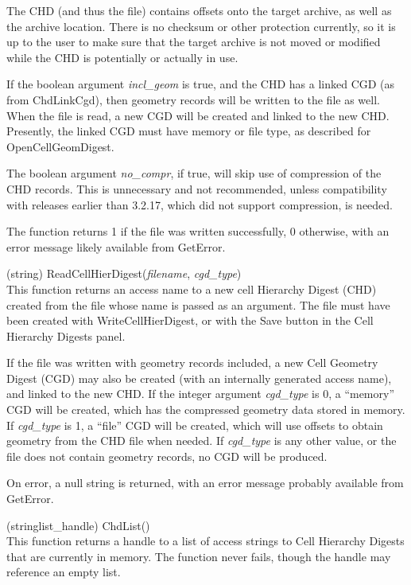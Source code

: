 \begin{description}
The CHD (and thus the file) contains offsets onto the target archive,
as well as the archive location.  There is no checksum or other
protection currently, so it is up to the user to make sure that the
target archive is not moved or modified while the CHD is
potentially or actually in use.

If the boolean argument {\it incl\_geom} is true, and the CHD has a
linked CGD (as from {\vt ChdLinkCgd}), then geometry records will be
written to the file as well.  When the file is read, a new CGD will be
created and linked to the new CHD.  Presently, the linked CGD must
have memory or file type, as described for {\vt OpenCellGeomDigest}.

The boolean argument {\it no\_compr}, if true, will skip use of
compression of the CHD records.  This is unnecessary and not
recommended, unless compatibility with {\Xic} releases earlier than
3.2.17, which did not support compression, is needed.

The function returns 1 if the file was written successfully, 0
otherwise, with an error message likely available from {\vt GetError}.

\item{(string) \vt ReadCellHierDigest({\it filename\/}, {\it cgd\_type\/})}\\
This function returns an access name to a new cell Hierarchy Digest
(CHD) created from the file whose name is passed as an argument.  The
file must have been created with {\vt WriteCellHierDigest}, or with
the {\cb Save} button in the {\cb Cell Hierarchy Digests} panel.

If the file was written with geometry records included, a new Cell
Geometry Digest (CGD) may also be created (with an internally
generated access name), and linked to the new CHD.  If the integer
argument {\it cgd\_type} is 0, a ``memory'' CGD will be created, which
has the compressed geometry data stored in memory.  If {\it cgd\_type}
is 1, a ``file'' CGD will be created, which will use offsets to obtain
geometry from the CHD file when needed.  If {\it cgd\_type} is any
other value, or the file does not contain geometry records, no CGD
will be produced.

On error, a null string is returned, with an error message probably
available from {\vt GetError}.

\item{(stringlist\_handle) \vt ChdList()}\\
This function returns a handle to a list of access strings to Cell
Hierarchy Digests that are currently in memory.  The function never
fails, though the handle may reference an empty list.


\end{description}
